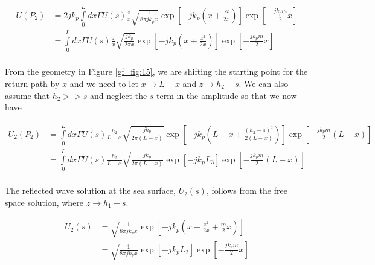 \begin{equation}
\begin{aligned}
U(P_2) &= 2jk_p\int\limits_{0}^{L}dx\Gamma U(s)\frac{z}{x}\sqrt{\frac{1}{8\pi jk_p x}}\exp\left[-jk_p\left(x +\frac{z^2}{2x} \right) \right]\exp\left[-\frac{jk_pm}{2}x\right] \\
&= \int\limits_{0}^{L}dx\Gamma U(s)\frac{z}{x}\sqrt{\frac{jk_p}{2\pi x}}\exp\left[-jk_p\left(x +\frac{z^2}{2x} \right) \right]\exp\left[-\frac{jk_pm}{2}x\right] \\
\end{aligned}
\label{gf_eq:55}
\end{equation}
\renewcommand{\baselinestretch}{2} \small\normalsize

From the geometry in Figure \ref{gf_fig:15}, we are shifting the starting point for the return path by $x$ and we need to let $x \rightarrow L-x$ and $z \rightarrow h_2-s$. We can also assume that $h_2 >> s$ and neglect the $s$ term in the amplitude so that we now have

\begin{equation}
\begin{aligned}
U_2(P_2) &= \int\limits_{0}^{L}dx\Gamma U(s)\frac{h_2}{L-x}\sqrt{\frac{jk_p}{2\pi (L-x)}}\exp\left[-jk_p\left(L-x +\frac{(h_2-s)^2}{2(L-x)} \right) \right]\exp\left[-\frac{jk_pm}{2}(L-x)\right] \\
&= \int\limits_{0}^{L}dx\Gamma U(s)\frac{h_2}{L-x}\sqrt{\frac{jk_p}{2\pi (L-x)}}\exp\left[-jk_pL_3\right]\exp\left[-\frac{jk_pm}{2}(L-x)\right] \\
\end{aligned}
\label{gf_eq:56}
\end{equation}
\renewcommand{\baselinestretch}{2} \small\normalsize

The reflected wave solution at the sea surface, $U_2(s)$, follows from the free space solution, where $z \rightarrow h_1-s$.

\begin{equation}
\begin{aligned}
U_2(s) &= \sqrt{\frac{1}{8\pi jk_px}}\exp\left[-jk_p\left(x+\frac{z^2}{2x} + \frac{m}{2}x\right)\right] \\
&=\sqrt{\frac{1}{8\pi jk_px}}\exp\left[-jk_pL_2\right]\exp\left[-\frac{jk_pm}{2}x\right] \\
\end{aligned}
\label{gf_eq:57}
\end{equation}
\renewcommand{\baselinestretch}{2} \small\normalsize

